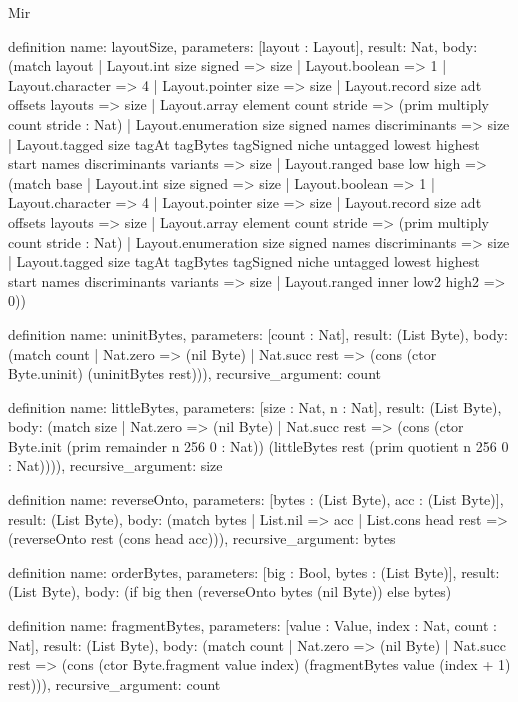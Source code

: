 \begin{lexlean}{Mir}
\begin{semanticmodule}
definition{
  name: layoutSize,
  parameters: [layout : Layout],
  result: Nat,
  body: (match layout
    | Layout.int size signed => size
    | Layout.boolean => 1
    | Layout.character => 4
    | Layout.pointer size => size
    | Layout.record size adt offsets layouts => size
    | Layout.array element count stride => (prim multiply count stride : Nat)
    | Layout.enumeration size signed names discriminants => size
    | Layout.tagged size tagAt tagBytes tagSigned niche untagged lowest highest start names discriminants variants => size
    | Layout.ranged base low high => (match base
      | Layout.int size signed => size
      | Layout.boolean => 1
      | Layout.character => 4
      | Layout.pointer size => size
      | Layout.record size adt offsets layouts => size
      | Layout.array element count stride => (prim multiply count stride : Nat)
      | Layout.enumeration size signed names discriminants => size
      | Layout.tagged size tagAt tagBytes tagSigned niche untagged lowest highest start names discriminants variants => size
      | Layout.ranged inner low2 high2 => 0))
}

definition{
  name: uninitBytes,
  parameters: [count : Nat],
  result: (List Byte),
  body: (match count
    | Nat.zero => (nil Byte)
    | Nat.succ rest => (cons (ctor Byte.uninit) (uninitBytes rest))),
  recursive_argument: count
}

definition{
  name: littleBytes,
  parameters: [size : Nat, n : Nat],
  result: (List Byte),
  body: (match size
    | Nat.zero => (nil Byte)
    | Nat.succ rest => (cons (ctor Byte.init (prim remainder n 256 0 : Nat)) (littleBytes rest (prim quotient n 256 0 : Nat)))),
  recursive_argument: size
}

definition{
  name: reverseOnto,
  parameters: [bytes : (List Byte), acc : (List Byte)],
  result: (List Byte),
  body: (match bytes
    | List.nil => acc
    | List.cons head rest => (reverseOnto rest (cons head acc))),
  recursive_argument: bytes
}

definition{
  name: orderBytes,
  parameters: [big : Bool, bytes : (List Byte)],
  result: (List Byte),
  body: (if big then (reverseOnto bytes (nil Byte)) else bytes)
}

definition{
  name: fragmentBytes,
  parameters: [value : Value, index : Nat, count : Nat],
  result: (List Byte),
  body: (match count
    | Nat.zero => (nil Byte)
    | Nat.succ rest => (cons (ctor Byte.fragment value index) (fragmentBytes value (index + 1) rest))),
  recursive_argument: count
}


\end{semanticmodule}
\end{lexlean}
